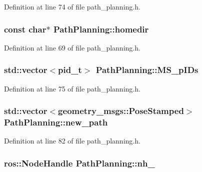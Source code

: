 Definition at line 74 of file path\-\_\-planning.\-h.

\hypertarget{classPathPlanning_a9ed58fad470b9b836cfa353805292362}{
\subsubsection[{homedir}]{\setlength{\rightskip}{0pt plus 5cm}const char$\ast$ Path\-Planning\-::homedir\hspace{0.3cm}{\ttfamily [private]}}}\label{classPathPlanning_a9ed58fad470b9b836cfa353805292362}


Definition at line 69 of file path\-\_\-planning.\-h.

\hypertarget{classPathPlanning_a8aed5a7bee30a377a8d6cb24032bd861}{
\subsubsection[{M\-S\-\_\-p\-I\-Ds}]{\setlength{\rightskip}{0pt plus 5cm}std\-::vector$<$pid\-\_\-t$>$ Path\-Planning\-::\-M\-S\-\_\-p\-I\-Ds\hspace{0.3cm}{\ttfamily [private]}}}\label{classPathPlanning_a8aed5a7bee30a377a8d6cb24032bd861}


Definition at line 75 of file path\-\_\-planning.\-h.

\hypertarget{classPathPlanning_a7967da99fc8e0c96d987528c96312187}{
\subsubsection[{new\-\_\-path}]{\setlength{\rightskip}{0pt plus 5cm}std\-::vector$<$geometry\-\_\-msgs\-::\-Pose\-Stamped$>$ Path\-Planning\-::new\-\_\-path\hspace{0.3cm}{\ttfamily [private]}}}\label{classPathPlanning_a7967da99fc8e0c96d987528c96312187}


Definition at line 82 of file path\-\_\-planning.\-h.

\hypertarget{classPathPlanning_a0d693961ace8af4460a0d26f4404757d}{
\subsubsection[{nh\-\_\-}]{\setlength{\rightskip}{0pt plus 5cm}ros\-::\-Node\-Handle Path\-Planning\-::nh\-\_\-\hspace{0.3cm}{\ttfamily [private]}}}\label{classPathPlanning_a0d693961ace8af4460a0d26f4404757d}


